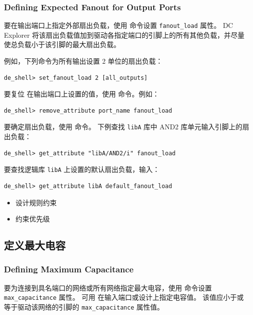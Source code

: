 \subsubsection*{Defining Expected Fanout for Output Ports}

要在输出端口上指定外部扇出负载，使用  命令设置 \texttt{fanout\_load} 属性。
DC Explorer 将该扇出负载值加到驱动各指定端口的引脚上的所有其他负载，并尽量使总负载小于该引脚的最大扇出负载。

例如，下列命令为所有输出设置 2 单位的扇出负载：
\begin{lstlisting}
de_shell> set_fanout_load 2 [all_outputs]
\end{lstlisting}

要复位  在输出端口上设置的值，使用  命令。例如：
\begin{lstlisting}
de_shell> remove_attribute port_name fanout_load
\end{lstlisting}

要确定扇出负载，使用  命令。
下例查找 \texttt{libA} 库中 AND2 库单元输入引脚上的扇出负载：
\begin{lstlisting}
de_shell> get_attribute "libA/AND2/i" fanout_load
\end{lstlisting}

要查找逻辑库 \texttt{libA} 上设置的默认扇出负载，输入：
\begin{lstlisting}
de_shell> get_attribute libA default_fanout_load
\end{lstlisting}

\begin{seeAlsoBox}
\begin{itemize}
  \item 设计规则约束
  \item 约束优先级
\end{itemize}
\end{seeAlsoBox}

\subsection{定义最大电容}
\subsubsection*{Defining Maximum Capacitance}

要为连接到具名端口的网络或所有网络指定最大电容，使用  命令设置 \texttt{max\_capacitance} 属性。
可用  在输入端口或设计上指定电容值。
该值应小于或等于驱动该网络的引脚的 \texttt{max\_capacitance} 属性值。

